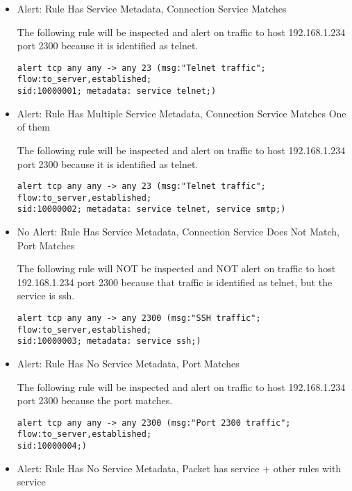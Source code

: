 \documentclass[english]{report}
\begin{document}
\begin{itemize}
\item{Alert: Rule Has Service Metadata, Connection Service Matches}

The following rule will be inspected and alert on traffic to host 192.168.1.234
port 2300 because it is identified as telnet.

\begin{verbatim}
alert tcp any any -> any 23 (msg:"Telnet traffic"; flow:to_server,established;
sid:10000001; metadata: service telnet;)
\end{verbatim}

\item{Alert: Rule Has Multiple Service Metadata, Connection Service Matches One of them}

The following rule will be inspected and alert on traffic to host 192.168.1.234
port 2300 because it is identified as telnet.

\begin{verbatim}
alert tcp any any -> any 23 (msg:"Telnet traffic"; flow:to_server,established;
sid:10000002; metadata: service telnet, service smtp;)
\end{verbatim}

\item{No Alert: Rule Has Service Metadata, Connection Service Does Not Match, Port Matches}

The following rule will NOT be inspected and NOT alert on traffic to host 192.168.1.234
port 2300 because that traffic is identified as telnet, but the service is ssh.

\begin{verbatim}
alert tcp any any -> any 2300 (msg:"SSH traffic"; flow:to_server,established;
sid:10000003; metadata: service ssh;)
\end{verbatim}

\item{Alert: Rule Has No Service Metadata, Port Matches}

The following rule will be inspected and alert on traffic to host 192.168.1.234
port 2300 because the port matches.

\begin{verbatim}
alert tcp any any -> any 2300 (msg:"Port 2300 traffic"; flow:to_server,established;
sid:10000004;)
\end{verbatim}

\item{Alert: Rule Has No Service Metadata, Packet has service + other rules with service}


\end{itemize}
\end{document}
